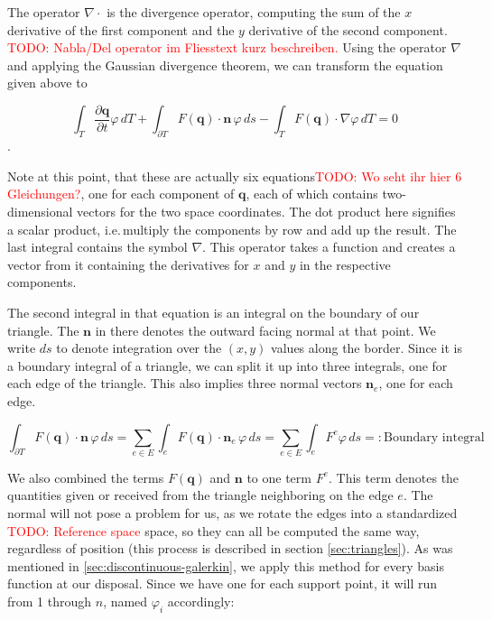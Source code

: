 \documentclass{article}
\newcommand{\todo}[2][]{\textcolor{red}{TODO\ifthenelse{\equal{#1}{}}{}{[#1]}: #2}}
\newcommand{\pd}[2]{\dfrac{\partial #1}{\partial #2}}
\renewcommand{\phi}{\varphi}
\begin{document}
The operator $\nabla \cdot$ is the divergence operator, computing the sum of the $x$ derivative of the first component and the $y$ derivative of the second component. \todo{Nabla/Del operator im Fliesstext kurz beschreiben.}
Using the operator $\nabla$ and applying the Gaussian divergence theorem, we can transform the equation given above to

\begin{equation}
  \label{eq:shallow-water-weak-form-div-applied}
  \int_T \pd {\mathbf{q}}{t} \phi \, dT +
  \int_{\partial T} F(\mathbf{q}) \cdot \mathbf{n} \, \phi \, ds -
  \int_T F(\mathbf{q}) \cdot \nabla \phi \, dT = 0
\end{equation}.

Note at this point, that these are actually six equations\todo{Wo seht ihr hier 6 Gleichungen?}, one for each component of $\mathbf{q}$, each of which contains two-dimensional vectors for the two space coordinates. The dot product here signifies a scalar product, i.e.\,multiply the components by row and add up the result. The last integral contains the symbol $\nabla$. This operator takes a function and creates a vector from it containing the derivatives for $x$ and $y$ in the respective components.

The second integral in that equation is an integral on the boundary of our triangle.
The $\mathbf{n}$ in there denotes the outward facing normal at that point.
We write $ds$ to denote integration over the $(x,y)$ values along the border.
Since it is a boundary integral of a triangle, we can split it up into three integrals, one for each edge of the triangle.
This also implies three normal vectors $\mathbf{n}_e$, one for each edge.

\begin{equation}
  \label{eq:boundary-integral-sum}
  \int_{\partial T} F(\mathbf{q}) \cdot \mathbf{n} \, \phi \, ds = \sum_{e \in E} \int_{e} F(\mathbf{q}) \cdot \mathbf{n}_e \, \phi \, ds = \sum_{e \in E} \int_{e} F^e \phi \, ds =: \text{Boundary integral}
\end{equation}

We also combined the terms $F(\mathbf{q})$ and $\mathbf{n}$ to one term $F^e$. This term denotes the quantities given or received from the triangle neighboring on the edge $e$. The normal will not pose a problem for us, as we rotate the edges into a standardized \todo{Reference space} space, so they can all be computed the same way, regardless of position (this process is described in section \ref{sec:triangles}). As was mentioned in \ref{sec:discontinuous-galerkin}, we apply this method for every basis function at our disposal. Since we have one for each support point, it will run from 1 through $n$, named $\phi_i$ accordingly:
\end{document}
